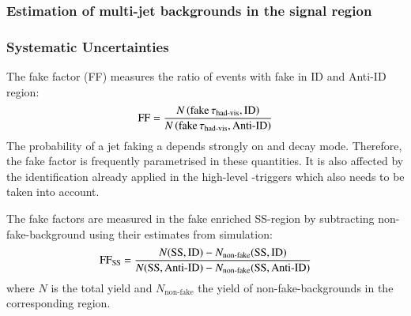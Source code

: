 \subsubsection{Estimation of multi-jet backgrounds in the signal region}


\subsubsection{Systematic Uncertainties}









The fake factor (FF) measures the ratio of events with fake \tauhadvis in ID and
Anti-ID region:
\begin{align*}
  \text{FF} = \frac{N\left( \text{fake} \, \tau_{\text{had-vis}}, \text{ID} \right)}{N\left( \text{fake} \, \tau_{\text{had-vis}}, \text{Anti-ID} \right)}
\end{align*}
The probability of a jet faking a \tauhadvis depends strongly on \tauhadvis \pT
and decay mode. Therefore, the fake factor is frequently parametrised in these
quantities. It is also affected by the \tauhadvis identification already applied
in the high-level \tauhadvis-triggers which also needs to be taken into account.

The fake factors are measured in the fake enriched SS-region by subtracting
non-fake-\tauhadvis background using their estimates from simulation:
\begin{align*}
  \text{FF}_\text{SS} = \frac{N(\text{SS}, \text{ID}) - N_\text{non-fake}(\text{SS}, \text{ID})}{N(\text{SS}, \text{Anti-ID}) - N_\text{non-fake}(\text{SS}, \text{Anti-ID})}
\end{align*}
where $N$ is the total yield and $N_\text{non-fake}$ the yield of
non-fake-\tauhadvis backgrounds in the corresponding region.

